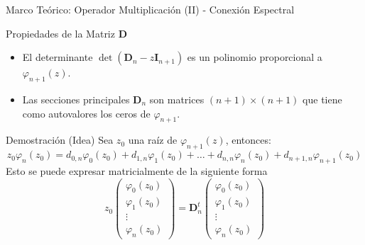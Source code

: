 \begin{frame}{Marco Teórico: Operador Multiplicación (II) - Conexión Espectral}
	\footnotesize
	\begin{block}{\footnotesize Propiedades de la Matriz $\mathbf{D}$}
		\begin{itemize}
			\item El determinante $\det(\mathbf{D}_n - z\mathbf{I}_{n+1})$ es un polinomio proporcional a $\varphi_{n+1}(z)$.
			\item Las secciones principales $\mathbf{D}_n$ son matrices $(n+1)\times(n+1)$ que tiene como autovalores los ceros de $\varphi_{n+1}$.
		\end{itemize}
	\end{block}
	\begin{block}{\footnotesize Demostración (Idea)}
		Sea $z_0$ una raíz de $\varphi_{n+1}(z)$, entonces:
		$$
			z_0\varphi_n(z_0)= d_{0,n}\varphi_0(z_0)+d_{1,n}\varphi_1(z_0)+\dots+d_{n,n}\varphi_n(z_0)+d_{n+1,n}\varphi_{n+1}(z_0)
		$$
		\noindent Esto se puede expresar matricialmente de la siguiente forma
		$$
			z_0\begin{pmatrix} \varphi_0(z_0) \\ \varphi_1(z_0) \\  \vdots \\ \varphi_n(z_0) \end{pmatrix} = \mathbf{D}^{t}_n \begin{pmatrix} \varphi_0(z_0) \\ \varphi_1(z_0) \\  \vdots \\ \varphi_n(z_0) \end{pmatrix}
		$$
	\end{block}
\end{frame}

